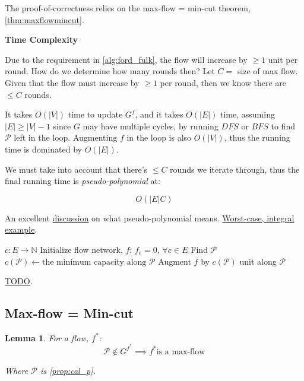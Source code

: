 \documentclass{article}
\newtheorem{lemma}[theorem]{Lemma}
\theoremstyle{definition}
\begin{document}
The proof-of-correctness relies on the max-flow = min-cut theorem, \ref{thm:maxflowmincut}. 

\textbf{Time Complexity}

Due to the requirement in \ref{alg:ford_fulk}, the flow will increase by $\geq 1$ unit per round. How do we determine how many rounds then? Let $C=$ size of max flow. Given that the flow must increase by $\geq 1$ per round, then we know there are $\leq C$ rounds. 

It takes $O(|V|)$ time to update $G^f$, and it takes $O(|E|)$ time, assuming $|E| \geq |V|-1$ since $G$ may have multiple cycles, by running $DFS$ or $BFS$ to find $\mathcal{P}$ left in the loop. Augmenting $f$ in the loop is also $O(|V|)$, thus the running time is dominated by $O(|E|)$. 

We must take into account that there's $\leq C$ rounds we iterate through, thus the final running time is \textit{pseudo-polynomial} at:

$$O(|E|C)$$

An excellent \href{https://stackoverflow.com/questions/19649026/is-network-flow-pseudo-polynomial-time}{discussion} on what pseudo-polynomial means. \href{https://en.wikipedia.org/wiki/Ford%E2%80%93Fulkerson_algorithm#Integral_example}{Worst-case, integral example}.
	
\begin{algorithm}
	\caption{$EdmonsKarp$}
	\label{alg:edmons_karp}
	\begin{algorithmic}[1]
		\REQUIRE $c : E \to \mathbb{N}$ 
		\STATE Initialize flow network, $f$: $f_e = 0, \, \forall e \in E$
		\STATE Find $\mathcal{P}$
		\STATE $c(\mathcal{P}) \gets \text{the minimum capacity along } \mathcal{P}$
		\STATE Augment $f$ by $c(\mathcal{P})$ unit along $\mathcal{P}$
		\ENDWHILE
	\end{algorithmic}
	\href{https://classroom.udacity.com/courses/ud401/lessons/8e8db62c-39bd-4dc2-bbe7-b9774e41756f/concepts/77dcde9a-43f0-4eea-889b-14b1ec034a28}{TODO}.
\end{algorithm}

\subsection{Max-flow = Min-cut}
\begin{lemma}
\label{lem:aug_path}
For a flow, $f^*$: $$\mathcal{P} \notin G^{f^*} \implies f^* \text{is a max-flow}$$
	
Where $\mathcal{P}$ is \ref{prop:cal_p}.
\end{lemma}
\end{document}
